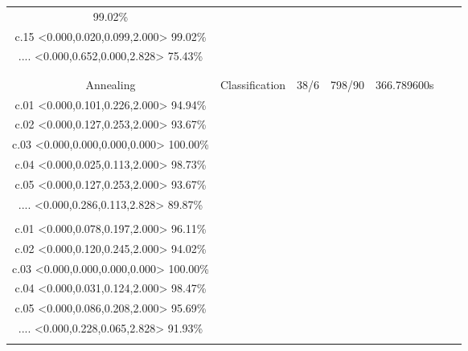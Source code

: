\documentclass[8pt, a4paper]{article}
\begin{document}
\begin{landscape}
\begin{tabular}{|c|c|c|c|c|c|c|}
99.02\%\\c.15 <0.000,0.020,0.099,2.000> 99.02\%\\.... <0.000,0.652,0.000,2.828> 75.43\%\\} \\
\hline
\\
Annealing & Classification & 38/6 & 798/90 & 366.789600s & \makecell{c.00 <0.000,0.025,0.113,2.000> 98.73\%\\c.01 <0.000,0.101,0.226,2.000> 94.94\%\\c.02 <0.000,0.127,0.253,2.000> 93.67\%\\c.03 <0.000,0.000,0.000,0.000> 100.00\%\\c.04 <0.000,0.025,0.113,2.000> 98.73\%\\c.05 <0.000,0.127,0.253,2.000> 93.67\%\\.... <0.000,0.286,0.113,2.828> 89.87\%\\} & \makecell{c.00 <0.000,0.008,0.065,2.000> 99.58\%\\c.01 <0.000,0.078,0.197,2.000> 96.11\%\\c.02 <0.000,0.120,0.245,2.000> 94.02\%\\c.03 <0.000,0.000,0.000,0.000> 100.00\%\\c.04 <0.000,0.031,0.124,2.000> 98.47\%\\c.05 <0.000,0.086,0.208,2.000> 95.69\%\\.... <0.000,0.228,0.065,2.828> 91.93\%\\} \\
\hline
\end{tabular}\newpage
\end{landscape}
\end{document}
